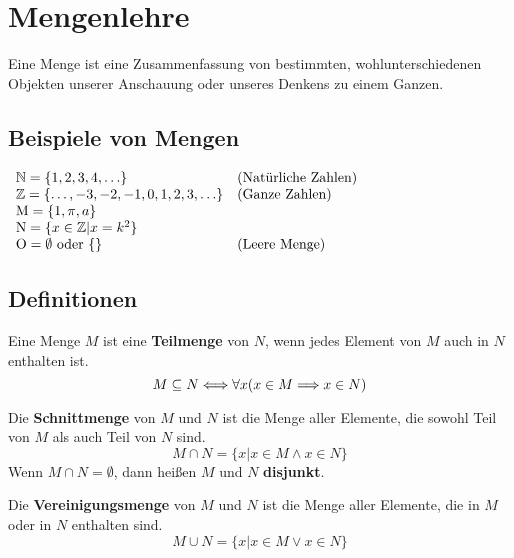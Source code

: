 \documentclass[11pt]{article}
\begin{document}
\section{Mengenlehre}
\begin{definition}
  Eine Menge ist eine Zusammenfassung von bestimmten, wohlunterschiedenen Objekten unserer Anschauung oder unseres Denkens zu einem Ganzen.
\end{definition}

\subsection{Beispiele von Mengen}
$
  \begin{array}{l l}
    \mathbb{N} = \{1, 2, 3, 4, \ldots\}                             & \text{(Natürliche Zahlen)} \\
    \mathbb{Z} = \{\ldots, -3, -2, -1, 0, 1, 2, 3, \ldots\} & \text{(Ganze Zahlen)}      \\
    \text{M} = \{1, \pi, a\}                                                             \\
    \text{N} = \{x\in\mathbb{Z} | x = k^2\}                                                      \\
    \text{O} = \emptyset\text{ oder }\{\}                   & \text{(Leere Menge)}       \\
  \end{array}
$

\subsection{Definitionen}
Eine Menge $M$ ist eine \textbf{Teilmenge} von $N$, wenn jedes Element von $M$ auch in $N$ enthalten ist.
\[
  M \subseteq N \Longleftrightarrow \forall x(x \in M \Longrightarrow x \in N)
\]

Die \textbf{Schnittmenge} von $M$ und $N$ ist die Menge aller Elemente, die sowohl Teil von $M$ als auch Teil von $N$ sind.
\[
  M \cap N = \{x | x \in M \land x \in N\}
\]
Wenn $M \cap N = \emptyset$, dann heißen $M$ und $N$ \textbf{disjunkt}.

Die \textbf{Vereinigungsmenge} von $M$ und $N$ ist die Menge aller Elemente, die in $M$ oder in $N$ enthalten sind.
\[
  M \cup N = \{x | x \in M \lor x \in N\}
\]
\end{document}
